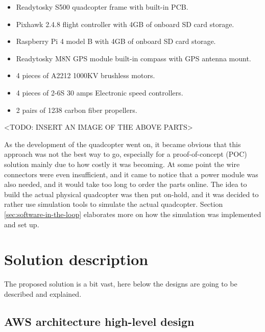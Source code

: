 \begin{itemize}
    \item Readytosky S500 quadcopter frame with built-in PCB.
    \item Pixhawk 2.4.8 flight controller with 4GB of onboard SD card storage.
    \item Raspberry Pi 4 model B with 4GB of onboard SD card storage.
    \item Readytosky M8N GPS module built-in compass with GPS antenna mount.
    \item 4 pieces of A2212 1000KV brushless motors.
    \item 4 pieces of 2-6S 30 amps Electronic speed controllers.
    \item 2 pairs of 1238 carbon fiber propellers.
\end{itemize}

<TODO: INSERT AN IMAGE OF THE ABOVE PARTS>

As the development of the quadcopter went on, it became obvious that this approach was not the best way to go, especially for a proof-of-concept (POC) solution mainly due to how costly it was becoming. At some point the wire connectors were even insufficient, and it came to notice that a power module was also needed, and it would take too long to order the parts online. The idea to build the actual physical quadcopter was then put on-hold, and it was decided to rather use simulation tools to simulate the actual quadcopter. Section \ref{sec:software-in-the-loop} elaborates more on how the simulation was implemented and set up.




\section{Solution description}
\label{solution-description}

The proposed solution is a bit vast, here below the designs are going to be described and explained.


\subsection{AWS architecture high-level design}
\label{subsec:aws-architecture-hld}

